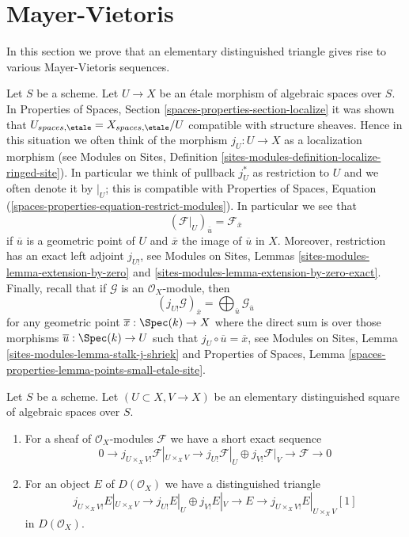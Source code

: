 \section{Mayer-Vietoris}
\label{section-mayer-vietoris}

\noindent
In this section we prove that an elementary distinguished triangle
gives rise to various Mayer-Vietoris sequences.

\medskip\noindent
Let $S$ be a scheme. Let $U \to X$ be an \'etale morphism of algebraic
spaces over $S$. In
Properties of Spaces, Section \ref{spaces-properties-section-localize}
it was shown that
$U_{spaces, \etale} = X_{spaces, \etale}/U$
compatible with structure sheaves. Hence in this situation we
often think of the morphism $j_U : U \to X$ as a localization morphism
(see Modules on Sites, Definition
\ref{sites-modules-definition-localize-ringed-site}).
In particular we think of pullback $j_U^*$ as restriction to $U$
and we often denote it by ${}|_U$; this is compatible with
Properties of Spaces, Equation
(\ref{spaces-properties-equation-restrict-modules}).
In particular we see that
\begin{equation}
\label{equation-stalk-restriction}
(\mathcal{F}|_U)_{\overline{u}} = \mathcal{F}_{\overline{x}}
\end{equation}
if $\overline{u}$ is a geometric point of $U$ and $\overline{x}$
the image of $\overline{u}$ in $X$.
Moreover, restriction has an exact left adjoint $j_{U!}$, see
Modules on Sites, Lemmas \ref{sites-modules-lemma-extension-by-zero} and
\ref{sites-modules-lemma-extension-by-zero-exact}.
Finally, recall that if $\mathcal{G}$ is an $\mathcal{O}_X$-module,
then
\begin{equation}
\label{equation-stalk-j-shriek}
(j_{U!}\mathcal{G})_{\overline{x}} =
\bigoplus\nolimits_{\overline{u}} \mathcal{G}_{\overline{u}}
\end{equation}
for any geometric point $\overline{x} : \Spec(k) \to X$ where the
direct sum is over those morphisms $\overline{u} : \Spec(k) \to U$
such that $j_U \circ \overline{u} = \overline{x}$, see
Modules on Sites, Lemma \ref{sites-modules-lemma-stalk-j-shriek}
and
Properties of Spaces, Lemma
\ref{spaces-properties-lemma-points-small-etale-site}.

\begin{lemma}
\label{lemma-exact-sequence-lower-shriek}
Let $S$ be a scheme. Let $(U \subset X, V \to X)$ be an elementary
distinguished square of algebraic spaces over $S$.
\begin{enumerate}
\item For a sheaf of $\mathcal{O}_X$-modules $\mathcal{F}$
we have a short exact sequence
$$
0 \to j_{U \times_X V!}\mathcal{F}|_{U \times_X V} \to
j_{U!}\mathcal{F}|_U \oplus j_{V!}\mathcal{F}|_V \to \mathcal{F} \to 0
$$
\item For an object $E$ of $D(\mathcal{O}_X)$ we have a distinguished
triangle
$$
j_{U \times_X V!}E|_{U \times_X V} \to
j_{U!}E|_U \oplus j_{V!}E|_V \to E \to 
j_{U \times_X V!}E|_{U \times_X V}[1]
$$
in $D(\mathcal{O}_X)$.
\end{enumerate}
\end{lemma}

